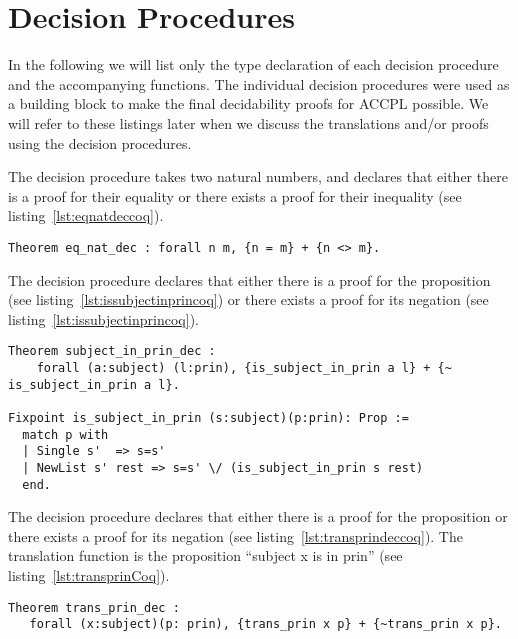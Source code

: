 \section{Decision Procedures}\label{sec:decprocs}

In the following we will list only the type declaration of each decision procedure and the accompanying functions. The individual decision procedures were used as a building block to make the final decidability proofs for \ac{ACCPL} possible. We will refer to these listings later when we discuss the translations and/or proofs using the decision procedures.

The decision procedure  takes two natural numbers, and declares that either there is a proof for their equality or there exists a proof for their inequality (see listing~\ref{lst:eqnatdeccoq}).

\begin{lstlisting}
Theorem eq_nat_dec : forall n m, {n = m} + {n <> m}.
\end{lstlisting}

The decision procedure  declares that either there is a proof for the proposition  (see listing~\ref{lst:issubjectinprincoq}) or there exists a proof for its negation (see listing~\ref{lst:issubjectinprincoq}). 

\begin{lstlisting}
Theorem subject_in_prin_dec :
    forall (a:subject) (l:prin), {is_subject_in_prin a l} + {~ is_subject_in_prin a l}.

Fixpoint is_subject_in_prin (s:subject)(p:prin): Prop :=
  match p with
  | Single s'  => s=s'
  | NewList s' rest => s=s' \/ (is_subject_in_prin s rest)
  end.
\end{lstlisting}

The decision procedure  declares that either there is a proof for the proposition  or there exists a proof for its negation (see listing~\ref{lst:transprindeccoq}). The translation function  is the proposition ``subject x is in prin'' (see listing~\ref{lst:transprinCoq}).

\begin{minipage}[c]{0.95\textwidth}
\begin{lstlisting}
Theorem trans_prin_dec :
   forall (x:subject)(p: prin), {trans_prin x p} + {~trans_prin x p}.
\end{lstlisting}
\end{minipage}

